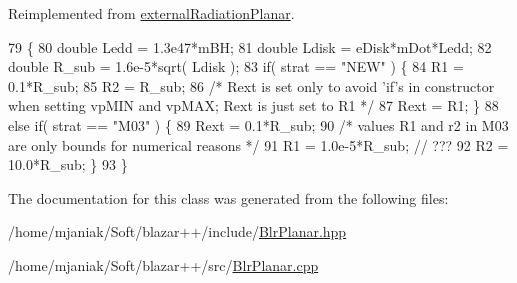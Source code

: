 Reimplemented from \hyperlink{classexternalRadiationPlanar_a710859cda6258d75098ccb31e60ab261}{external\-Radiation\-Planar}.


\begin{DoxyCode}
79                            \{
80   \textcolor{keywordtype}{double} Ledd = 1.3e47*mBH;
81   \textcolor{keywordtype}{double} Ldisk = eDisk*mDot*Ledd;
82   \textcolor{keywordtype}{double} R\_sub = 1.6e-5*sqrt( Ldisk );
83   \textcolor{keywordflow}{if}( strat == \textcolor{stringliteral}{"NEW"} ) \{
84     R1 = 0.1*R\_sub;
85     R2 = R\_sub;
86       \textcolor{comment}{/* Rext is set only to avoid 'if's in constructor when setting vpMIN and vpMAX; Rext is just set to
       R1 */}
87     Rext = R1; \}
88   \textcolor{keywordflow}{else} \textcolor{keywordflow}{if}( strat == \textcolor{stringliteral}{"M03"} ) \{
89     Rext = 0.1*R\_sub;
90     \textcolor{comment}{/* values R1 and r2 in M03 are only bounds for numerical reasons */}
91     R1 = 1.0e-5*R\_sub; \textcolor{comment}{// ???}
92     R2 = 10.0*R\_sub; \}
93 \}
\end{DoxyCode}


The documentation for this class was generated from the following files\-:\begin{DoxyCompactItemize}
\item 
/home/mjaniak/\-Soft/blazar++/include/\hyperlink{BlrPlanar_8hpp}{Blr\-Planar.\-hpp}\item 
/home/mjaniak/\-Soft/blazar++/src/\hyperlink{BlrPlanar_8cpp}{Blr\-Planar.\-cpp}\end{DoxyCompactItemize}
